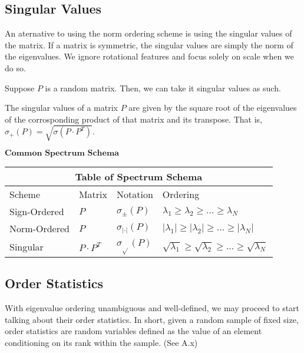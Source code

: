 
\subsection{Singular Values}

An aternative to using the norm ordering scheme is using the singular values of the matrix. If a matrix is symmetric, the singular values are simply the norm of the eigenvalues. We ignore rotational features and focus solely on scale when we do so.

Suppose $P$ is a random matrix. Then, we can take it singular values as such.

\begin{definition}
The singular values of a matrix $P$ are given by the square root of the eigenvalues of the corrosponding product of that matrix and its transpose. That is, $\sigma_+(P) = \sqrt{\sigma(P \cdot P^T)}$.
\end{definition}

\newpage

\begin{center}
$\textbf{Common Spectrum Schema}$
\end{center}

\begin{tabular}{ |p{3cm}|p{2cm}|p{3cm}|p{5cm}|  }
 \hline
 \multicolumn{4}{|c|}{Table of Spectrum Schema} \\
 \hline
 Scheme & Matrix & Notation & Ordering \\
 \hline
 Sign-Ordered & $P$ & $\sigma_{\pm}(P)$ & $\lambda_1 \geq \lambda_2 \geq ... \geq \lambda_N$ \\
 Norm-Ordered & $P$ & $\sigma_{|\cdot|}(P)$ & $|\lambda_1| \geq |\lambda_2| \geq ... \geq |\lambda_N|$ \\
 Singular & $P \cdot P^T$ & $\sigma_{\sqrt{}}(P)$ & $\sqrt{\lambda_1} \geq \sqrt{\lambda_2} \geq ... \geq \sqrt{\lambda_N}$ \\
 \hline
\end{tabular}


\subsection{Order Statistics}

With eigenvalue ordering unambiguous and well-defined, we may proceed to start talking about their order statistics. In short, given a random sample of fixed size, order statistics are random variables defined as the value of an element conditioning on its rank within the sample. (See A.x)

